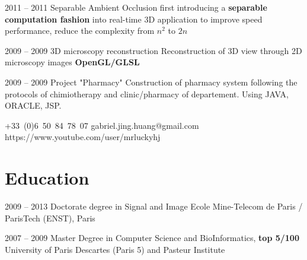 \documentclass{tccv}
\begin{document}
\begin{eventlist}
\item{2011 -- 2011}
		 {Separable Ambient Occlusion}
		 {first introducing a \textbf{separable computation fashion} into real-time 3D application to improve speed performance, reduce the complexity from $n^2$ to $2n$}
		
\item{2009 -- 2009}
     {3D microscopy reconstruction}
     {Reconstruction of 3D view through 2D microscopy images \textbf{OpenGL/GLSL}}

\item{2009 -- 2009}
     {Project "Pharmacy"}
     {Construction of pharmacy system following the protocols of chimiotherapy and clinic/pharmacy of departement.
Using JAVA, ORACLE, JSP.}


\end{eventlist}


%

    {+33~(0)6~50~84~78~07}
    {gabriel.jing.huang@gmail.com}
		{https://www.youtube.com/user/mrluckyhj}

\section{Education}

\begin{yearlist}

\item{2009 -- 2013}
     {Doctorate degree in Signal and Image}
     {Ecole Mine-Telecom de Paris / ParisTech (ENST), Paris}

\item{2007 -- 2009}
     {Master Degree in Computer Science and BioInformatics, \textbf{top 5/100}}
     {University of Paris Descartes (Paris 5) and Pasteur Institute}

\end{yearlist}
\end{document}
